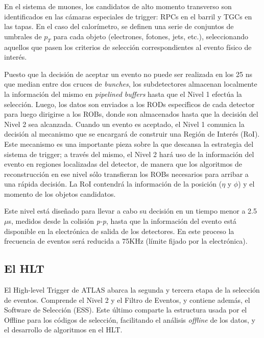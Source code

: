    En el sistema de muones, los candidatos de alto momento transverso son identificados en las c\'amaras especiales de trigger: RPCs en el barril y TGCs en las tapas. En el caso del calor\'imetro, se definen una serie de conjuntos de umbrales de $p_T$ para cada objeto (electrones, fotones, jets, etc.), seleccionando aquellos que pasen los criterios de selecci\'on correspondientes al evento f\'isico de inter\'es. 

   Puesto que la decisi\'on de aceptar un evento no puede ser realizada en los 25 ns que median entre dos cruces de \emph{bunches}, los subdetectores almacenan localmente la informaci\'on del mismo en \emph{pipelined buffers} hasta que el Nivel 1 efect\'ua la selecci\'on. Luego, los datos son enviados a los RODs especi\'ficos de cada detector para luego dirigirse a los ROBs, donde son almacenados hasta que la decisi\'on del Nivel 2 sea alcanzada. 
   Cuando un evento es aceptado, el Nivel 1 comunica la decisi\'on al mecanismo que se encargar\'a de construir una Regi\'on de Inter\'es (RoI). Este mecanismo es una importante pieza sobre la que descansa la estrategia del sistema de trigger; a trav\'es del mismo, el Nivel 2 har\'a uso de la informaci\'on del evento en regiones localizadas del detector, de manera que los algoritmos de reconstrucci\'on en ese nivel s\'olo transfieran los ROBs necesarios para arribar a una r\'apida decisi\'on. %
La RoI contendr\'a la informaci\'on de la posici\'on ($\eta$ y $\phi$) y el momento de los objetos candidatos.

   Este nivel est\'a dise\~nado para llevar a cabo su decisi\'on en un tiempo menor a 2.5 $\mu$s, medidos desde la colisi\'on \emph{p-p}, hasta que la informaci\'on del evento est\'a disponible en la electr\'onica de salida de los detectores. En este proceso la frecuencia de eventos ser\'a reducida a 75KHz (l\'imite fijado por la electr\'onica).

\subsection{El HLT}

 El High-level Trigger de ATLAS abarca la segunda y tercera etapa de la selecci\'on de eventos. Comprende el Nivel 2 y el Filtro de Eventos, y contiene adem\'as, el Software de Selecci\'on (ESS). Este \'ultimo comparte la estructura usada por el Offline para los c\'odigos de selecci\'on, facilitando el an\'alisis \emph{offline} de los datos, y el desarrollo de algoritmos en el HLT.

